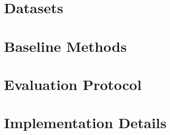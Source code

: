 \documentclass[a4paper,oneside,10pt,ngerman,english]{scrbook}
\begin{document}
\section{Datasets}
\section{Baseline Methods}
\section{Evaluation Protocol}
\section{Implementation Details}
\end{document}
